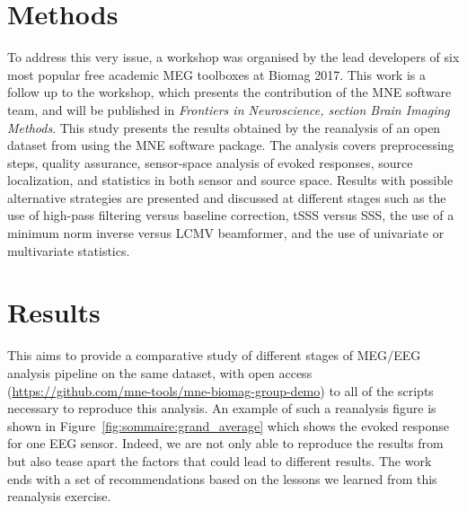 \section*{Methods}
To address this very issue, a workshop was organised by the lead developers of six most popular free academic MEG toolboxes at Biomag 2017. This work is a follow up to the workshop, which presents the contribution of the MNE software team, and will be published in \emph{Frontiers in Neuroscience, section Brain Imaging Methods}. This study presents the results obtained by the reanalysis of an open dataset from \citet{wakeman2015multi} using the MNE software package. The analysis covers preprocessing steps, quality assurance, sensor-space analysis of evoked responses, source localization, and statistics in both sensor and source space. Results with possible alternative strategies are presented and discussed at different stages such as the use of high-pass filtering versus baseline correction, tSSS versus \ac{SSS}, the use of a minimum norm inverse versus \ac{LCMV} beamformer, and the use of univariate or multivariate statistics. 


\section*{Results}

This aims to provide a comparative study of different stages of \ac{MEG}/\ac{EEG} analysis pipeline on the same dataset, with open access (\url{https://github.com/mne-tools/mne-biomag-group-demo}) to all of the scripts necessary to reproduce this analysis. An example of such a reanalysis figure is shown in Figure~\ref{fig:sommaire:grand_average} which shows the evoked response for one EEG sensor. Indeed, we are not only able to reproduce the results from \citet{wakeman2015multi} but also tease apart the factors that could lead to different results. The work ends with a set of recommendations based on the lessons we learned from this reanalysis exercise.

